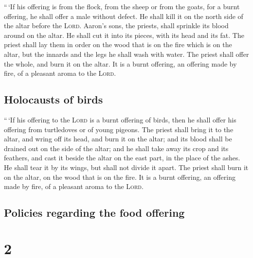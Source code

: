  ``\,`If his offering is from the flock, from the sheep
or from the goats, for a burnt offering, he shall offer a male without
defect.  He shall kill it on the north side of the altar
before the \textsc{Lord}. Aaron's sons, the priests, shall sprinkle its
blood around on the altar.  He shall cut it into its
pieces, with its head and its fat. The priest shall lay them in order on
the wood that is on the fire which is on the altar,  but
the innards and the legs he shall wash with water. The priest shall
offer the whole, and burn it on the altar. It is a burnt offering, an
offering made by fire, of a pleasant aroma to the \textsc{Lord}.

\hypertarget{holocausts-of-birds}{%
\subsection{Holocausts of birds}\label{holocausts-of-birds}}

 ``\,`If his offering to the \textsc{Lord} is a burnt
offering of birds, then he shall offer his offering from turtledoves or
of young pigeons.  The priest shall bring it to the
altar, and wring off its head, and burn it on the altar; and its blood
shall be drained out on the side of the altar;  and he
shall take away its crop and its feathers, and cast it beside the altar
on the east part, in the place of the ashes.  He shall
tear it by its wings, but shall not divide it apart. The priest shall
burn it on the altar, on the wood that is on the fire. It is a burnt
offering, an offering made by fire, of a pleasant aroma to the
\textsc{Lord}.

\hypertarget{policies-regarding-the-food-offering}{%
\subsection{Policies regarding the food
offering}\label{policies-regarding-the-food-offering}}

\hypertarget{section-1}{%
\section{2}\label{section-1}}

